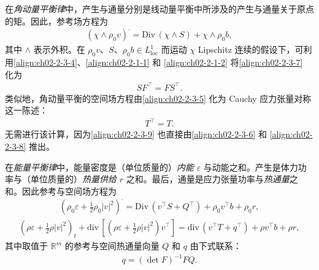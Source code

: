 ﻿\documentclass[../../main.tex]{subfiles}
\begin{document}
在\emph{角动量平衡律}中，产生与通量分别是线动量平衡中所涉及的产生与通量关于原点的矩。因此，参考场方程为
\begin{align}
(\chi\wedge\rho_{0}v)^{\cdot}=\mathrm{Div}\,(\chi\wedge S)+\chi\wedge\rho_{0}b,
\label{align:ch02-2-3-7}
\end{align}
其中 $\wedge$ 表示外积。在 $\rho_{0}v$、$S$、$\rho_{0}b\in L^{1}_{\mathrm{loc}}$ 而运动 $\chi$ Lipschitz 连续的假设下，可利用\eqref{align:ch02-2-3-4}、\eqref{align:ch02-2-1-1} 和 \eqref{align:ch02-2-1-2} 将\eqref{align:ch02-2-3-7} 化为
\begin{align}
SF^{\top}=FS^{\top}.
\label{align:ch02-2-3-8}
\end{align}
类似地，角动量平衡的空间场方程由\eqref{align:ch02-2-3-5} 化为 Cauchy 应力张量对称这一陈述：
\begin{align}
T^{\top}=T.
\label{align:ch02-2-3-9}
\end{align}
无需进行该计算，因为\eqref{align:ch02-2-3-9} 也直接由\eqref{align:ch02-2-3-6} 和 \eqref{align:ch02-2-3-8} 推出。

在\emph{能量平衡律}中，能量密度是（单位质量的）\emph{内能} $\varepsilon$ 与动能之和。产生是体力功率与（单位质量的）\emph{热量供给} $r$ 之和。最后，通量是应力张量功率与\emph{热通量}之和。因此参考与空间场方程为
\begin{align}
(\rho_{0}\varepsilon+\tfrac{1}{2}\rho_{0}|v|^{2})^{\cdot}=\mathrm{Div}\,(v^{\top}S+Q^{\top})+\rho_{0}v^{\top}b+\rho_{0}r,
\label{align:ch02-2-3-10}
\end{align}
\begin{align}
(\rho\varepsilon+\tfrac{1}{2}\rho|v|^{2})_{t}+\mathrm{div}\,[(\rho\varepsilon+\tfrac{1}{2}\rho|v|^{2})v^{\top}]=\mathrm{div}\,(v^{\top}T+q^{\top})+\rho v^{\top}b+\rho r,
\label{align:ch02-2-3-11}
\end{align}
其中取值于 $\mathbb{R}^{m}$ 的参考与空间热通量向量 $Q$ 和 $q$ 由下式联系：
\begin{align}
q=(\det F)^{-1}FQ.
\label{align:ch02-2-3-12}
\end{align}
\end{document}
